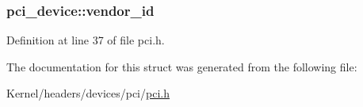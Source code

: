 \hypertarget{structpci__device_a6f02a7bd1fe6f83842830fe93c17f844}{
\subsubsection[{vendor\_\-id}]{ {\bf pci\_\-device::vendor\_\-id}}}
\label{structpci__device_a6f02a7bd1fe6f83842830fe93c17f844}


Definition at line 37 of file pci.h.



The documentation for this struct was generated from the following file:\begin{DoxyCompactItemize}
\item 
Kernel/headers/devices/pci/\hyperlink{pci_8h}{pci.h}\end{DoxyCompactItemize}
